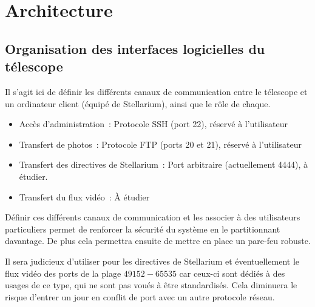 \chapter{Architecture}

\section{Organisation des interfaces logicielles du télescope}

Il s'agit ici de définir les différents canaux de communication entre le télescope et un ordinateur client (équipé de Stellarium), ainsi que le rôle de chaque.

\begin{itemize}[label=$\bullet$]
	\item Accès d'administration~: Protocole SSH (port 22), réservé à l'utilisateur 
	\item Transfert de photos~: Protocole FTP (ports 20 et 21), réservé à l'utilisateur 
	\item Transfert des directives de Stellarium~: Port arbitraire (actuellement 4444), à étudier.
	\item Transfert du flux vidéo~: À étudier
	\end{itemize}

\vspace{1cm}

Définir ces différents canaux de communication et les associer à des utilisateurs particuliers permet de renforcer la sécurité du système en le partitionnant davantage. De plus cela permettra ensuite de mettre en place un pare-feu robuste.

\vspace{1cm}

Il sera judicieux d'utiliser pour les directives de Stellarium et éventuellement le flux vidéo des ports de la plage $49152 - 65535$ car ceux-ci sont dédiés à des usages de ce type, qui ne sont pas voués à être standardisés. Cela diminuera le risque d'entrer un jour en conflit de port avec un autre protocole réseau.
